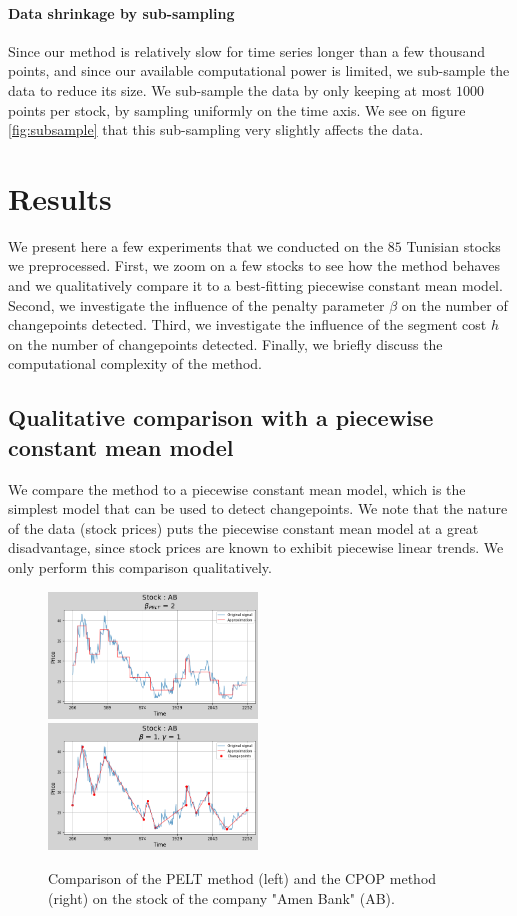 \documentclass[11pt]{article}
\begin{document}
\paragraph*{Data shrinkage by sub-sampling} Since our method is relatively slow for time series longer than a few thousand points, and since our available computational power is limited, we sub-sample the data to reduce its size. We sub-sample the data by only keeping at most $1000$ points per stock, by sampling uniformly on the time axis. We see on figure \ref{fig:subsample} that this sub-sampling very slightly affects the data.
\section{Results}
We present here a few experiments that we conducted on the $85$ Tunisian stocks we preprocessed. First, we zoom on a few stocks to see how the method behaves and we qualitatively compare it to a best-fitting piecewise constant mean model. Second, we investigate the influence of the penalty parameter $\beta$ on the number of changepoints detected. Third, we investigate the influence of the segment cost $h$ on the number of changepoints detected. Finally, we briefly discuss the computational complexity of the method.
\subsection{Qualitative comparison with a piecewise constant mean model}
We compare the method to a piecewise constant mean model, which is the simplest model that can be used to detect changepoints. We note that the nature of the data (stock prices) puts the piecewise constant mean model at a great disadvantage, since stock prices are known to exhibit piecewise linear trends. We only perform this comparison qualitatively.
\begin{figure}[h]
    \centering
    \includegraphics[width=0.495\textwidth]{figures/comparaison CPOP PELT/PELT.png}
    \includegraphics[width=0.495\textwidth]{figures/comparaison CPOP PELT/CPOP.png}
    \caption{Comparison of the PELT method (left) and the CPOP method (right) on the stock of the company "Amen Bank" (AB).}
    \label{fig:comparison}
\end{figure}
\end{document}
